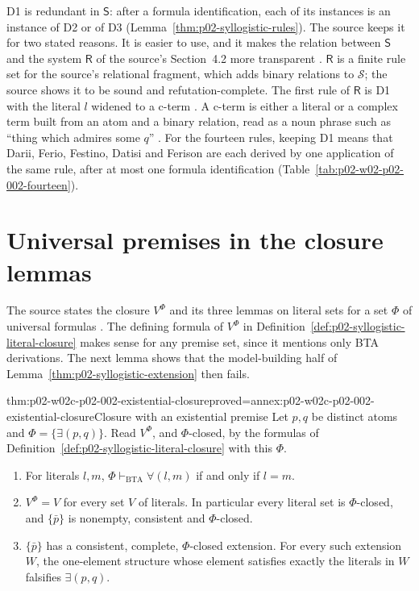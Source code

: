 D1 is redundant in \(\mathsf S\): after a formula identification, each of
its instances is an instance of D2 or of D3
(Lemma~\ref{thm:p02-syllogistic-rules}). The source keeps it for two stated
reasons. It is easier to use, and it makes the relation between
\(\mathsf S\) and the system \(\mathsf R\) of the source's Section~4.2 more
transparent \cite[pp.~12--13]{PrattHartmannMoss2008SyllogisticV1}.
\(\mathsf R\) is a finite rule set for the source's relational fragment,
which adds binary relations to \(\mathcal S\); the source shows it to be
sound and refutation-complete. The first rule of \(\mathsf R\) is D1 with the
literal \(l\) widened to a c-term
\cite[p.~20]{PrattHartmannMoss2008SyllogisticV1}. A c-term is either a
literal or a complex term built from an atom and a binary relation, read as a
noun phrase such as ``thing which admires some \(q\)''
\cite[p.~4]{PrattHartmannMoss2008SyllogisticV1}. For the fourteen rules,
keeping D1 means that Darii, Ferio, Festino, Datisi and Ferison are each
derived by one application of the same rule, after at most one formula
identification (Table~\ref{tab:p02-w02-p02-002-fourteen}).

\section{Universal premises in the closure lemmas}
\label{sec:p02-w02c-p02-002-universal}

The source states the closure \(V^\Phi\) and its three lemmas on literal
sets for a set \(\Phi\) of universal formulas
\cite[pp.~14--15]{PrattHartmannMoss2008SyllogisticV1}. The defining formula
of \(V^\Phi\) in Definition~\ref{def:p02-syllogistic-literal-closure} makes
sense for any premise set, since it mentions only BTA derivations. The next
lemma shows that the model-building half of
Lemma~\ref{thm:p02-syllogistic-extension} then fails.

\begin{hblemma}{thm:p02-w02c-p02-002-existential-closure}{proved=annex:p02-w02c-p02-002-existential-closure}{Closure with an existential premise}
Let \(p,q\) be distinct atoms and \(\Phi=\{\exists(p,q)\}\). Read
\(V^\Phi\), and \(\Phi\)-closed, by the formulas of
Definition~\ref{def:p02-syllogistic-literal-closure} with this \(\Phi\).
\begin{enumerate}
\item For literals \(l,m\),
 \(\Phi\vdash_{\mathrm{BTA}}\forall(l,m)\) if and only if \(l=m\).
\item \(V^\Phi=V\) for every set \(V\) of literals. In particular every
 literal set is \(\Phi\)-closed, and \(\{\bar p\}\) is nonempty, consistent
 and \(\Phi\)-closed.
\item \(\{\bar p\}\) has a consistent, complete, \(\Phi\)-closed extension.
 For every such extension \(W\), the one-element structure whose element
 satisfies exactly the literals in \(W\) falsifies \(\exists(p,q)\).
\end{enumerate}
\end{hblemma}

